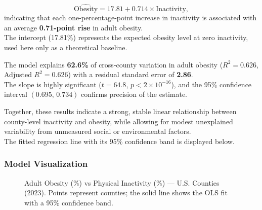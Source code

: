 \documentclass[
  letterpaper,
  DIV=11,
  numbers=noendperiod]{scrartcl}
\begin{document}
\[
\widehat{\text{Obesity}} = 17.81 + 0.714 \times \text{Inactivity},
\] indicating that each one-percentage-point increase in inactivity is
associated with an average \textbf{0.71-point rise} in adult obesity.\\
The intercept (17.81\%) represents the expected obesity level at zero
inactivity, used here only as a theoretical baseline.

The model explains \textbf{62.6\%} of cross-county variation in adult
obesity (\(R^{2}=0.626\), Adjusted \(R^{2}=0.626\)) with a residual
standard error of \textbf{2.86}.\\
The slope is highly significant (\(t=64.8\), \(p<2\times10^{-16}\)), and
the 95\% confidence interval \((0.695,\,0.734)\) confirms precision of
the estimate.

Together, these results indicate a strong, stable linear relationship
between county-level inactivity and obesity, while allowing for modest
unexplained variability from unmeasured social or environmental
factors.\\
The fitted regression line with its 95\% confidence band is displayed
below.

\subsubsection{Model Visualization}\label{model-visualization}

\begin{figure}


\caption{\label{fig-county-scatter}Adult Obesity (\%) vs Physical
Inactivity (\%) --- U.S. Counties (2023). Points represent counties; the
solid line shows the OLS fit with a 95\% confidence band.}

\end{figure}%
\end{document}
